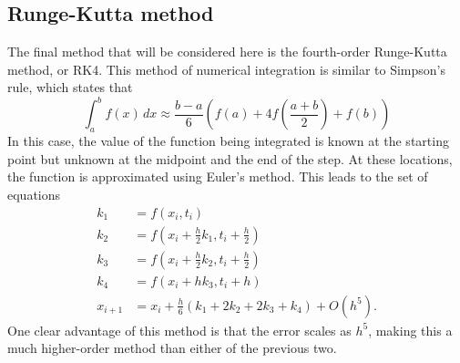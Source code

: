 \documentclass[aps,prc,reprint,nobalancelastpage]{revtex4-1}
\begin{document}
    \subsection{Runge-Kutta method}
    \label{sub:rk4}

        The final method that will be considered here is the fourth-order Runge-Kutta method, or RK4. This method of numerical integration is similar to Simpson's rule, which states that
        \begin{equation*}
            \int_{a}^{b} f(x)\,dx \approx \frac{b-a}{6} \left( f(a) + 4 f\!\left(\frac{a+b}{2}\right) + f(b) \right)
        \end{equation*}
        In this case, the value of the function being integrated is known at the starting point but unknown at the midpoint and the end of the step. At these locations, the function is approximated using Euler's method. This leads to the set of equations
        \begin{align}
            k_1     &= f(x_i, t_i) \\
            k_2     &= f(x_i + \tfrac{h}{2} k_1, t_i + \tfrac{h}{2}) \\
            k_3     &= f(x_i + \tfrac{h}{2} k_2, t_i + \tfrac{h}{2}) \\
            k_4     &= f(x_i + h k_3, t_i + h) \\
            x_{i+1} &= x_i + \tfrac{h}{6}(k_1 + 2k_2 + 2k_3 + k_4) + O(h^5).
        \end{align}
        One clear advantage of this method is that the error scales as $h^5$, making this a much higher-order method than either of the previous two.
\end{document}
